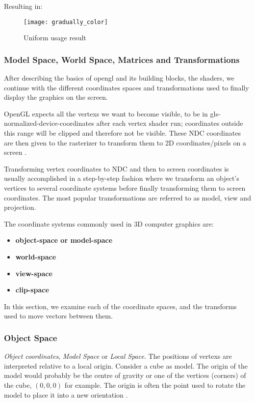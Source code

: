 Resulting in: 
\begin{figure}[h!]
	\centering
	\texttt{[image: gradually\_color]}
	\caption{Uniform usage result \cite{learnopengl}}
	\label{fig:uniform-usage}
\end{figure}


\subsubsection{Model Space, World Space, Matrices and Transformations}

After describing the basics of \gls{opengl} and its building blocks, the \glspl{shader}, we continue with the different coordinates spaces and transformations used to finally display the graphics on the screen.

OpenGL expects all the \glspl{vertex} we want to become visible, to be in \gls{gls-normalized-device-coordinates} after each vertex shader run; coordinates outside this range will be clipped and therefore not be visible. These \gls{NDC} coordinates are then given to the rasterizer to transform them to 2D coordinates/pixels on a screen \cite{learnopengl}.

Transforming vertex coordinates to \gls{NDC} and then to screen coordinates is usually accomplished in a step-by-step fashion where we transform an object's vertices to several coordinate systems before finally transforming them to screen coordinates. The most popular transformations are referred to as model, view and projection.

The coordinate systems commonly used in 3D computer graphics are:
\begin{itemize}
	\item \textbf{\gls{object-space} or \gls{model-space}}
	\item \textbf{\gls{world-space}}
	\item \textbf{\gls{view-space}}
	\item \textbf{\gls{clip-space}}
\end{itemize}
In this section, we examine each of the coordinate spaces, and the transforms used to move vectors between them.

\subsubsection{Object Space}

\emph{Object coordinates}, \emph{Model Space} or \emph{Local Space}. The positions of \glspl{vertex} are interpreted relative to a local origin. Consider a cube as model. The origin of the model would probably be the centre of gravity or one of the vertices (corners) of the cube, $(0,0,0)$ for example. The origin is often the point used to rotate the model to place it into a new orientation \cite{superbible}.


